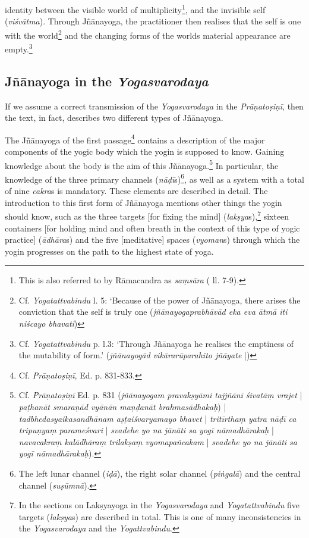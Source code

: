 identity between the visible world of multiplicity\footnote{This is also referred to by Rāmacandra as \textit{saṃsāra} ( ll. 7-9).}, and the invisible self (\textit{viśvātma}). Through Jñānayoga, the practitioner then realises that the self is one with the world\footnote{Cf. \textit{Yogatattvabindu}  \pageref{svabhava1} l. 5: `Because of the power of Jñānayoga, there arises the conviction that the self is truly one (\textit{jñānayogaprabhāvād eka eva ātmā iti niścayo bhavati})} and the changing forms of the worlds material appearance are empty.\footnote{Cf. \textit{Yogatattvabindu}  p.\pageref{svabhava2} l.3: `Through Jñānayoga he realises the emptiness of the mutability of form.' (\textit{jñānayogād vikārarūparahito jñāyate} |)}

\subsection{Jñānayoga in the \textit{Yogasvarodaya}}
\label{svarodayajnana}
If we assume a correct transmission of the \textit{Yogasvarodaya} in the \textit{Prāṇatoṣiṇī}, then the text, in fact, describes two different types of Jñānayoga. 

The Jñānayoga of the first passage\footnote{Cf. \textit{Prāṇatoṣiṇī}, Ed. p. 831-833.} contains a description of the major components of the yogic body which the yogin is supposed to know. Gaining knowledge about the body is the aim of this Jñānayoga.\footnote{Cf. \textit{Prāṇatoṣiṇī} Ed. p. 831 (\textit{jñānayogam pravakṣyāmi tajjñānī śivatāṃ vrajet} | \textit{paṭhanāt smaraṇād vyānān maṇḍanāt brahmasādhakaḥ}) | \textit{tadbhedasyaikasandhānam aṣṭaiśvaryamayo bhavet} | \textit{tritīrthaṃ yatra nāḍī ca tripuṇyaṃ parameśvari} | \textit{svadehe yo na jānāti sa yogī nāmadhārakaḥ} | \textit{navacakraṃ kalādhāraṃ trilakṣaṃ vyomapañcakam} | \textit{svadehe yo na jānāti sa yogī nāmadhārakaḥ}).} In particular, the knowledge of the three primary channels (\textit{nāḍī}s)\footnote{The left lunar channel (\textit{iḍā}), the right solar channel (\textit{piṅgalā}) and the central channel (\textit{suṣūmnā}).}, as well as a system with a total of nine \textit{cakra}s is mandatory. These elements are described in detail. The introduction to this first form of Jñānayoga mentions other things the yogin should know, such as the three targets [for fixing the mind] (\textit{lakṣya}s),\footnote{In the sections on Lakṣyayoga in the \textit{Yogasvarodaya} and \textit{Yogatattvabindu} five targets (\textit{lakṣya}s) are described in total. This is one of many inconsistencies in the \textit{Yogasvarodaya} and the \textit{Yogattvabindu}.} sixteen containers [for holding mind and often breath in the context of this type of yogic practice] (\textit{ādhāra}s) and the five [meditative] spaces (\textit{vyoman}s) through which the yogin progresses on the path to the highest state of yoga. 

